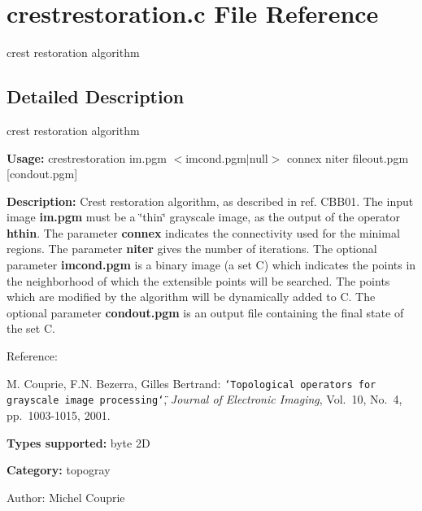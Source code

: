 \section{crestrestoration.c File Reference}
\label{crestrestoration_8c}
crest restoration algorithm  




\label{_details}
\subsection{Detailed Description}
crest restoration algorithm 

{\bf Usage:} crestrestoration im.pgm $<$imcond.pgm$|$null$>$ connex niter fileout.pgm [condout.pgm]

{\bf Description:} Crest restoration algorithm, as described in ref. CBB01. The input image {\bf im.pgm} must be a \char`\"{}thin\char`\"{} grayscale image, as the output of the operator {\bf hthin}. The parameter {\bf connex} indicates the connectivity used for the minimal regions. The parameter {\bf niter} gives the number of iterations. The optional parameter {\bf imcond.pgm} is a binary image (a set C) which indicates the points in the neighborhood of which the extensible points will be searched. The points which are modified by the algorithm will be dynamically added to C. The optional parameter {\bf condout.pgm} is an output file containing the final state of the set C.

Reference:\par
 [CBB01] M. Couprie, F.N. Bezerra, Gilles Bertrand: {\tt \char`\"{}Topological operators for grayscale image processing\char`\"{}}, {\em  Journal of Electronic Imaging\/}, Vol.~10, No.~4, pp.~1003-1015, 2001.

{\bf Types supported:} byte 2D

{\bf Category:} topogray

\begin{Desc}
\item[Author:]Michel Couprie \end{Desc}
